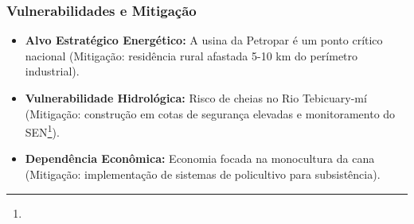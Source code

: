 \subsubsection{Vulnerabilidades e
Mitigação}

\begin{itemize}
\tightlist
\item
  \textbf{Alvo Estratégico Energético:} A usina da Petropar é um ponto
  crítico nacional (Mitigação: residência rural afastada 5-10 km do
  perímetro industrial).
\item
  \textbf{Vulnerabilidade Hidrológica:} Risco de cheias no Rio
  Tebicuary-mí (Mitigação: construção em cotas de segurança elevadas e
  monitoramento do SEN\footnote{\fineSEN}).
\item
  \textbf{Dependência Econômica:} Economia focada na monocultura da cana
  (Mitigação: implementação de sistemas de policultivo para
  subsistência).
\end{itemize}

